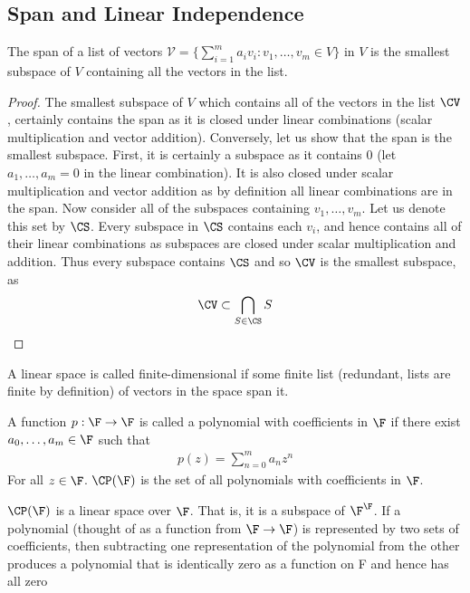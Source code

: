 \documentclass{article}
\begin{document}
\subsection{Span and Linear Independence}
  \begin{prop}
    The span of a list of vectors $\mathcal{V} = \{\sum_{i = 1}^{m}a_iv_i: v_1, \dots, v_m \in V\}$ in $V$ is the smallest subspace of $V$ containing all the vectors in the
    list. 
  \end{prop}
  \begin{proof}
    The smallest subspace of $V$ which contains all of the vectors in the list $\CV$, certainly contains the span as it is closed under linear combinations (scalar
    multiplication and vector addition). Conversely, let us show that the span is the smallest subspace. First, it is certainly a subspace as it contains $0$ (let $a_1, \dots,
    a_m = 0$ in the linear combination). It is also closed under scalar multiplication and vector addition as by definition all linear combinations are in the span. Now
    consider all of the subspaces containing $v_1, \dots, v_m$. Let us denote this set by $\CS$. Every subspace in $\CS$ contains each $v_i$, and hence contains all of their
    linear combinations as subspaces are closed under scalar multiplication and addition. Thus every subspace contains $\CS$ and so $\CV$ is the smallest subspace, as 
    \begin{align*}
      \CV \subset \bigcap_{S \in \CS}S
    \end{align*}
  \end{proof}
  \begin{defn}
    A linear space is called finite-dimensional if some finite list (redundant, lists are finite by definition) of vectors in the space span it.
  \end{defn}
  \begin{defn}
    A function $p: \F \to \F$ is called a polynomial with coefficients in $\F$ if there exist $a_0, \dots, a_m \in \F$ such that
    \begin{align*}
      p(z) = \sum_{n = 0}^{m}a_nz^n
    \end{align*}
    For all $z \in \F$. $\CP(\F)$ is the set of all polynomials with coefficients in $\F$. 
  \end{defn}
  $\CP(\F)$ is a linear space over $\F$. That is, it is a subspace of $\F^\F$. If a polynomial (thought of as a function from $\F \to \F$) is represented by two sets of
  coefficients, then subtracting one representation of the polynomial from the other produces a polynomial that is identically zero as a function on F and hence has all zero
\end{document}
